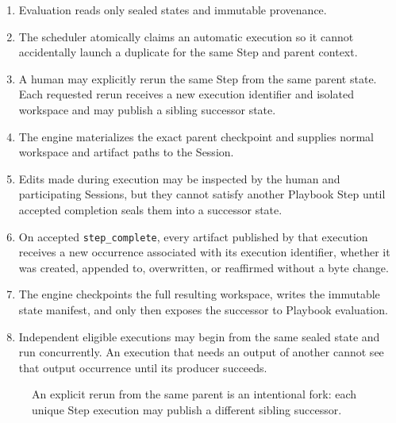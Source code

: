 \documentclass[11pt]{article}
\begin{document}
\begin{enumerate}
  \item Evaluation reads only sealed states and immutable provenance.
  \item The scheduler atomically claims an automatic execution so it cannot accidentally launch a duplicate for the same Step and parent context.
  \item A human may explicitly rerun the same Step from the same parent state. Each requested rerun receives a new execution identifier and isolated workspace and may publish a sibling successor state.
  \item The engine materializes the exact parent checkpoint and supplies normal workspace and artifact paths to the Session.
  \item Edits made during execution may be inspected by the human and participating Sessions, but they cannot satisfy another Playbook Step until accepted completion seals them into a successor state.
  \item On accepted \texttt{step\_complete}, every artifact published by that execution receives a new occurrence associated with its execution identifier, whether it was created, appended to, overwritten, or reaffirmed without a byte change.
  \item The engine checkpoints the full resulting workspace, writes the immutable state manifest, and only then exposes the successor to Playbook evaluation.
  \item Independent eligible executions may begin from the same sealed state and run concurrently. An execution that needs an output of another cannot see that output occurrence until its producer succeeds.
\end{enumerate}

\begin{figure}[ht]
\centering
{}
\caption{An explicit rerun from the same parent is an intentional fork: each unique Step execution may publish a different sibling successor.}
\label{fig:explicit-step-rerun-fork}
\end{figure}
\end{document}
